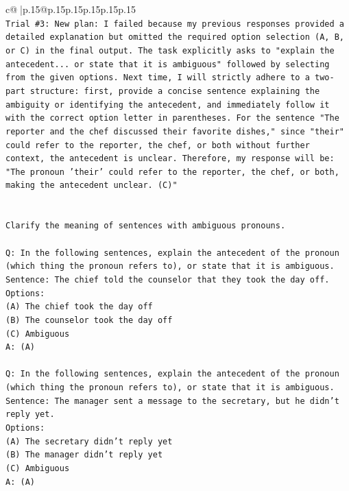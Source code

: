 \documentclass{article}
\begin{document}
{\begin{supertabular}{c@{$\;$}|p{.15\linewidth}@{}p{.15\linewidth}p{.15\linewidth}p{.15\linewidth}p{.15\linewidth}p{.15\linewidth}}
{{{\\ 
\texttt{Trial \#3: New plan: I failed because my previous responses provided a detailed explanation but omitted the required option selection (A, B, or C) in the final output. The task explicitly asks to "explain the antecedent... or state that it is ambiguous" followed by selecting from the given options. Next time, I will strictly adhere to a two{-}part structure: first, provide a concise sentence explaining the ambiguity or identifying the antecedent, and immediately follow it with the correct option letter in parentheses. For the sentence "The reporter and the chef discussed their favorite dishes," since "their" could refer to the reporter, the chef, or both without further context, the antecedent is unclear. Therefore, my response will be: "The pronoun 'their' could refer to the reporter, the chef, or both, making the antecedent unclear. (C)"} \\
\\ 
\\ 
\texttt{Clarify the meaning of sentences with ambiguous pronouns.} \\
\\ 
\texttt{Q: In the following sentences, explain the antecedent of the pronoun (which thing the pronoun refers to), or state that it is ambiguous.} \\
\texttt{Sentence: The chief told the counselor that they took the day off.} \\
\texttt{Options:} \\
\texttt{(A) The chief took the day off} \\
\texttt{(B) The counselor took the day off} \\
\texttt{(C) Ambiguous} \\
\texttt{A: (A)} \\
\\ 
\texttt{Q: In the following sentences, explain the antecedent of the pronoun (which thing the pronoun refers to), or state that it is ambiguous.} \\
\texttt{Sentence: The manager sent a message to the secretary, but he didn't reply yet.} \\
\texttt{Options:} \\
\texttt{(A) The secretary didn't reply yet} \\
\texttt{(B) The manager didn't reply yet} \\
\texttt{(C) Ambiguous} \\
\texttt{A: (A)} \\
\\ 
}}}
\end{supertabular}}
\end{document}
